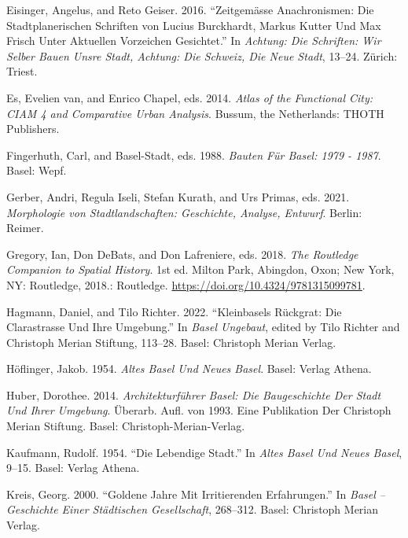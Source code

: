 \documentclass[
  letterpaper,
  DIV=11,
  numbers=noendperiod]{scrartcl}
\newlength{\cslhangindent}
\newenvironment{CSLReferences}[2] %
 {\begin{list}{}{%
  \setlength{\itemindent}{0pt}
  \setlength{\leftmargin}{0pt}
  \setlength{\parsep}{0pt}
  \ifodd #1
   \setlength{\leftmargin}{\cslhangindent}
   \setlength{\itemindent}{-1\cslhangindent}
  \fi
  \setlength{\itemsep}{#2\baselineskip}}}
 {\end{list}}
\begin{document}
\begin{CSLReferences}{1}{0}
Eisinger, Angelus, and Reto Geiser. 2016. {``Zeitgemässe
{Anachronismen}: Die Stadtplanerischen {Schriften} von {Lucius}
{Burckhardt}, {Markus} {Kutter} Und {Max} {Frisch} Unter Aktuellen
{Vorzeichen} Gesichtet.''} In \emph{Achtung: Die {Schriften}: {Wir}
Selber Bauen Unsre {Stadt}, {Achtung}: Die {Schweiz}, {Die} Neue
{Stadt}}, 13--24. Zürich: Triest.

Es, Evelien van, and Enrico Chapel, eds. 2014. \emph{Atlas of the
Functional City: {CIAM} 4 and Comparative Urban Analysis}. Bussum, the
Netherlands: THOTH Publishers.

Fingerhuth, Carl, and Basel-Stadt, eds. 1988. \emph{Bauten Für {Basel}:
1979 - 1987}. Basel: Wepf.

Gerber, Andri, Regula Iseli, Stefan Kurath, and Urs Primas, eds. 2021.
\emph{Morphologie von {Stadtlandschaften}: {Geschichte}, {Analyse},
{Entwurf}}. Berlin: Reimer.

Gregory, Ian, Don DeBats, and Don Lafreniere, eds. 2018. \emph{The
{Routledge} {Companion} to {Spatial} {History}}. 1st ed. Milton Park,
Abingdon, Oxon; New York, NY: Routledge, 2018.: Routledge.
\url{https://doi.org/10.4324/9781315099781}.

Hagmann, Daniel, and Tilo Richter. 2022. {``Kleinbasels {Rückgrat}:
{Die} {Clarastrasse} Und Ihre {Umgebung}.''} In \emph{Basel Ungebaut},
edited by Tilo Richter and Christoph Merian Stiftung, 113--28. Basel:
Christoph Merian Verlag.

Höflinger, Jakob. 1954. \emph{Altes {Basel} Und {Neues} {Basel}}. Basel:
Verlag Athena.

Huber, Dorothee. 2014. \emph{Architekturführer {Basel}: Die
{Baugeschichte} Der {Stadt} Und Ihrer {Umgebung}}. Überarb. Aufl. von
1993. Eine {Publikation} Der {Christoph} {Merian} {Stiftung}. Basel:
Christoph-Merian-Verlag.

Kaufmann, Rudolf. 1954. {``Die Lebendige {Stadt}.''} In \emph{Altes
{Basel} Und {Neues} {Basel}}, 9--15. Basel: Verlag Athena.

Kreis, Georg. 2000. {``Goldene {Jahre} Mit Irritierenden
{Erfahrungen}.''} In \emph{Basel -- {Geschichte} Einer Städtischen
{Gesellschaft}}, 268--312. Basel: Christoph Merian Verlag.


\end{CSLReferences}
\end{document}
